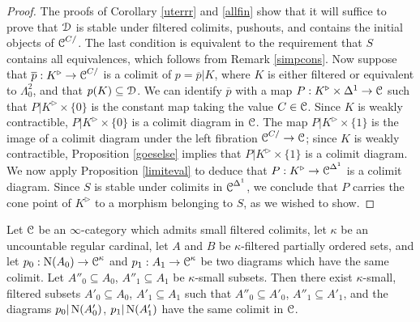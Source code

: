 \begin{proof}
The proofs of Corollary \ref{uterrr} and \ref{allfin} show that it will suffice to prove that $\operatorname{\mathcal{D}}$ is stable under filtered colimits, pushouts, and contains the initial objects of $\operatorname{\mathcal{C}}^{C/}$. The last condition is equivalent to the requirement that $S$ contains all equivalences, which follows from Remark \ref{simpcons}. Now suppose that $\overline{p}: K^{\triangleright} \rightarrow \operatorname{\mathcal{C}}^{C/}$
is a colimit of $p = \overline{p} | K$, where $K$ is either filtered or equivalent to $\Lambda^2_0$,
and that $p(K) \subseteq \operatorname{\mathcal{D}}$. We can identify $\overline{p}$ with a map
$P: K^{\triangleright} \times \Delta^1 \rightarrow \operatorname{\mathcal{C}}$ such that
$P | K^{\triangleright} \times \{0\}$ is the constant map taking the value $C \in \operatorname{\mathcal{C}}$.
Since $K$ is weakly contractible, $P | K^{\triangleright} \times \{0\}$ is a colimit diagram in $\operatorname{\mathcal{C}}$.
The map $P | K^{\triangleright} \times \{1\}$ is the image of a colimit diagram under the left
fibration $\operatorname{\mathcal{C}}^{C/} \rightarrow \operatorname{\mathcal{C}}$; since $K$ is weakly contractible, Proposition \ref{goeselse} implies that $P | K^{\triangleright} \times \{1\}$ is a colimit diagram. We now apply
Proposition \ref{limiteval} to deduce that
$P: K^{\triangleright} \rightarrow \operatorname{\mathcal{C}}^{\Delta^1}$ is a colimit diagram. Since $S$ is stable under colimits in $\operatorname{\mathcal{C}}^{\Delta^1}$, we conclude that $P$
carries the cone point of $K^{\triangleright}$ to a morphism belonging to $S$, as we wished to show.
\end{proof}

\begin{lemma}\label{walter}
Let $\operatorname{\mathcal{C}}$ be an $\infty$-category which admits small filtered colimits, let $\kappa$ be an uncountable regular cardinal, let $A$ and $B$ be $\kappa$-filtered partially ordered sets, and
let $p_0: \operatorname{N}(A_0) \rightarrow \operatorname{\mathcal{C}}^{\kappa}$ and $p_1: A_1 \rightarrow \operatorname{\mathcal{C}}^{\kappa}$ be two diagrams which have the same colimit. Let $A''_0 \subseteq A_0$, $A''_1 \subseteq A_1$ be $\kappa$-small subsets. Then
there exist $\kappa$-small, filtered subsets $A'_0 \subseteq A_0$, $A'_1 \subseteq A_1$ such that
$A''_0 \subseteq A'_0$, $A''_1 \subseteq A'_1$, and the diagrams $p_0|\operatorname{N}(A'_0)$, $p_1|\operatorname{N} (A'_1)$ have the same colimit in $\operatorname{\mathcal{C}}$.
\end{lemma}

